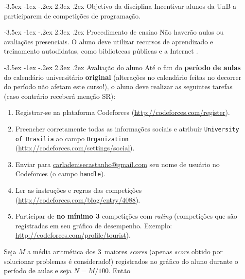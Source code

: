\documentclass{UnBExam}%
\makeatletter
\newcommand{\numerocontests}{3}
\newcommand{\fatorescala}{100}
\renewcommand\section{\@startsection{section}{1}{\z@}%
	{-3.5ex \@plus -1ex \@minus -.2ex}%
	{2.3ex \@plus.2ex}%
	{\normalfont\normalsize\bfseries}}%
\renewcommand{\indent}{\hspace{.5cm}}
\makeatother
\begin{document}
\section{Objetivo da disciplina}
\vspace{-.25cm}
\indent Incentivar alunos da UnB a participarem de competições de programação.

\vspace{-.25cm}
\section{Procedimento de ensino}
\vspace{-.25cm}
\indent Não haverão aulas ou avaliações presenciais. O aluno deve utilizar recursos de aprendizado e treinamento autodidatas, como bibliotecas públicas e a Internet \cite{halim2013competitive,cormen2009introduction,pimentaarticle}.

\vspace{-.25cm}
\section{Avaliação do aluno}
\vspace{-.25cm}
\indent Até o fim do \textbf{período de aulas} do calendário universitário \textbf{original} (alterações no calendário feitas no decorrer do período não afetam este curso!), o aluno deve realizar as seguintes tarefas (caso contrário receberá menção SR):
\begin{enumerate}
	\item Registrar-se na plataforma Codeforces (\url{http://codeforces.com/register}).
	\item Preencher corretamente todas as informações sociais e atribuir \texttt{University of Brasilia} ao campo \texttt{Organization} (\url{http://codeforces.com/settings/social}).
	\item Enviar para \url{carladenisecastanho@gmail.com} seu nome de usuário no Codeforces (o campo \texttt{handle}).
	\item Ler as instruções e regras das competições (\url{http://codeforces.com/blog/entry/4088}).
	\item Participar de \textbf{no mínimo \numerocontests} competições com \textit{rating} (competições que são registradas em seu gráfico de desempenho. Exemplo: \url{http://codeforces.com/profile/tourist}).
\end{enumerate}
\indent Seja $M$ a média aritmética dos \numerocontests\ maiores \textit{scores} (apenas \textit{score} obtido por solucionar problemas é considerado!) registrados no gráfico do aluno durante o período de aulas e seja $N = M/\fatorescala$. Então
\end{document}
